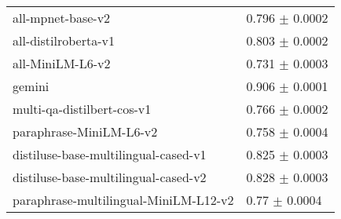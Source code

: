 \begin{table}[h!]
{\begin{tabular}{ll}
                    all-mpnet-base-v2 &                 0.796 $\pm$ 0.0002 \\
                 all-distilroberta-v1 &                 0.803 $\pm$ 0.0002 \\
                     all-MiniLM-L6-v2 &                 0.731 $\pm$ 0.0003 \\
                               gemini &                 0.906 $\pm$ 0.0001 \\
           multi-qa-distilbert-cos-v1 &                 0.766 $\pm$ 0.0002 \\
              paraphrase-MiniLM-L6-v2 &                 0.758 $\pm$ 0.0004 \\
 distiluse-base-multilingual-cased-v1 &                 0.825 $\pm$ 0.0003 \\
 distiluse-base-multilingual-cased-v2 &                 0.828 $\pm$ 0.0003 \\
paraphrase-multilingual-MiniLM-L12-v2 &                  0.77 $\pm$ 0.0004 \\

\end{tabular}}
\end{table}
